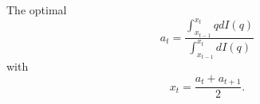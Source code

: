 \documentclass[12pt]{article}
\begin{document}
The optimal 
\begin{equation}
a_{t}=\frac{\int_{x_{t-1}}^{x_{t}}{qdI(q)}}{\int_{x_{t-1}}^{x_{t}}{dI(q)}}
\end{equation}
with
\begin{equation}
x_{t}=\frac{a_{t}+a_{t+1}}{2}. 
\end{equation}
\end{document}

